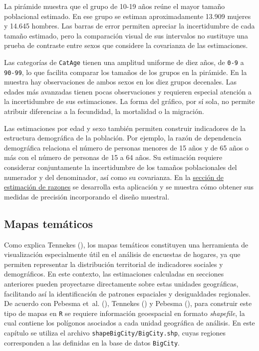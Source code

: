 \documentclass[
  spanish,
  11pt,
  letterpaper,
  oneside,
  open=any]{scrbook}
\begin{document}
La pirámide muestra que el grupo de 10-19 años reúne el mayor tamaño
poblacional estimado. En ese grupo se estiman aproximadamente 13.909
mujeres y 14.645 hombres. Las barras de error permiten apreciar la
incertidumbre de cada tamaño estimado, pero la comparación visual de sus
intervalos no sustituye una prueba de contraste entre sexos que
considere la covarianza de las estimaciones.

Las categorías de \texttt{CatAge} tienen una amplitud uniforme de diez
años, de \texttt{0-9} a \texttt{90-99}, lo que facilita comparar los
tamaños de los grupos en la pirámide. En la muestra hay observaciones de
ambos sexos en los diez grupos decenales. Las edades más avanzadas
tienen pocas observaciones y requieren especial atención a la
incertidumbre de sus estimaciones. La forma del gráfico, por sí sola, no
permite atribuir diferencias a la fecundidad, la mortalidad o la
migración.

Las estimaciones por edad y sexo también permiten construir indicadores
de la estructura demográfica de la población. Por ejemplo, la razón de
dependencia demográfica relaciona el número de personas menores de 15
años y de 65 años o más con el número de personas de 15 a 64 años. Su
estimación requiere considerar conjuntamente la incertidumbre de los
tamaños poblacionales del numerador y del denominador, así como su
covarianza. En la \hyperref[estimacion-de-razones]{sección de estimación
de razones} se desarrolla esta aplicación y se muestra cómo obtener sus
medidas de precisión incorporando el diseño muestral.

\subsection{Mapas temáticos}\label{viz-mapas}

Como explica Tennekes (), los mapas
temáticos constituyen una herramienta de visualización especialmente
útil en el análisis de encuestas de hogares, ya que permiten representar
la distribución territorial de indicadores sociales y demográficos. En
este contexto, las estimaciones calculadas en secciones anteriores
pueden proyectarse directamente sobre estas unidades geográficas,
facilitando así la identificación de patrones espaciales y desigualdades
regionales. De acuerdo con Pebesma et~al. (),
Tennekes () y Pebesma
(), para construir este tipo de mapas
en \texttt{R} se requiere información geoespacial en formato
\emph{shapefile}, la cual contiene los polígonos asociados a cada unidad
geográfica de análisis. En este capítulo se utiliza el archivo
\texttt{shapeBigCity/BigCity.shp}, cuyas regiones corresponden a las
definidas en la base de datos \texttt{BigCity}.
\end{document}
